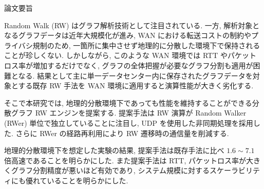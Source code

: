 \begin{center}
\Huge{論文要旨}
\end{center}




Random Walk (RW) はグラフ解析技術として注目されている. 一方, 解析対象となるグラフデータは近年大規模化が進み, WAN における転送コストの制約やプライバシ規制のため, 一箇所に集中させず地理的に分散した環境下で保持されることが珍しくない. しかしながら, このような WAN 環境では RTT やパケットロス率が増加するだけでなく, グラフの全体把握が必要なグラフ分割も適用が困難となる. 結果として主に単一データセンター内に保存されたグラフデータを対象とする既存 RW 手法を WAN 環境に適用すると演算性能が大きく劣化する. 

そこで本研究では, 地理的分散環境下であっても性能を維持することができる分散グラフ RW エンジンを提案する. 提案手法は RW 演算が Random Walker (RWer) 単位で独立していることに注目し, UDP を使用した非同期処理を採用した. さらに RWer の経路再利用により RW 遷移時の通信量を削減する. 

地理的分散環境下を想定した実験の結果, 提案手法は既存手法に比べ $1.6 \sim 7.1$ 倍高速であることを明らかにした. また提案手法は RTT, パケットロス率が大きくグラフ分割精度が悪いほど有効であり, システム規模に対するスケーラビリティにも優れていることを明らかにした. 

\vspace{36pt}
\thispagestyle{empty}
\clearpage